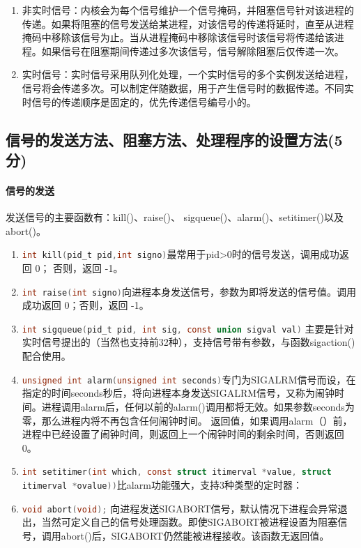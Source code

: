 \begin{enumerate}
    \item 非实时信号：内核会为每个信号维护一个信号掩码，并阻塞信号针对该进程的传递。如果将阻塞的信号发送给某进程，对该信号的传递将延时，直至从进程掩码中移除该信号为止。当从进程掩码中移除该信号时该信号将传递给该进程。如果信号在阻塞期间传递过多次该信号，信号解除阻塞后仅传递一次。
    \item 实时信号：实时信号采用队列化处理，一个实时信号的多个实例发送给进程，信号将会传递多次。可以制定伴随数据，用于产生信号时的数据传递。不同实时信号的传递顺序是固定的，优先传递信号编号小的。
\end{enumerate}

\subsection{信号的发送方法、阻塞方法、处理程序的设置方法(5分)}
\paragraph{信号的发送}发送信号的主要函数有：kill()、raise()、 sigqueue()、alarm()、setitimer()以及abort()。
\begin{enumerate}
    \item \lstinline[language=c]|int kill(pid_t pid,int signo)|最常用于pid>0时的信号发送，调用成功返回 0； 否则，返回 -1。
    \item \lstinline[language=c]|int raise(int signo)|向进程本身发送信号，参数为即将发送的信号值。调用成功返回 0；否则，返回 -1。
    \item \lstinline[language=c]|int sigqueue(pid_t pid, int sig, const union sigval val)| 主要是针对实时信号提出的（当然也支持前32种），支持信号带有参数，与函数sigaction()配合使用。
    \item \lstinline[language=c]|unsigned int alarm(unsigned int seconds)|专门为SIGALRM信号而设，在指定的时间seconds秒后，将向进程本身发送SIGALRM信号，又称为闹钟时间。进程调用alarm后，任何以前的alarm()调用都将无效。如果参数seconds为零，那么进程内将不再包含任何闹钟时间。 
    返回值，如果调用alarm（）前，进程中已经设置了闹钟时间，则返回上一个闹钟时间的剩余时间，否则返回0。
    \item \lstinline[language=c]|int setitimer(int which, const struct itimerval *value, struct itimerval *ovalue))|比alarm功能强大，支持3种类型的定时器：
    \item \lstinline[language=c]|void abort(void);| 向进程发送SIGABORT信号，默认情况下进程会异常退出，当然可定义自己的信号处理函数。即使SIGABORT被进程设置为阻塞信号，调用abort()后，SIGABORT仍然能被进程接收。该函数无返回值。
\end{enumerate}

